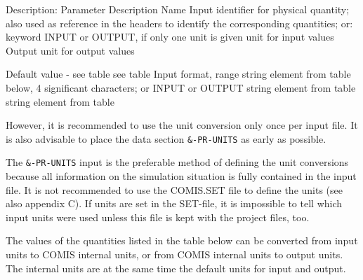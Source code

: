 \documentclass[10pt]{book}
\begin{document}
Description:  
Parameter  Description  
Name Input  identifier for physical quantity; also used as reference in the headers to identify the corresponding quantities; or: keyword INPUT or OUTPUT, if only one unit is given unit for input values  
Output  unit for output values  

Default value - 
see table see table Input format, range 
string element from table below, 4 significant characters; or INPUT or OUTPUT 
string element from table string element from table 

However, it is recommended to use the unit conversion only once per input file. It is also advisable to place the data section \verb|&-PR-UNITS| as early as possible.

The \verb|&-PR-UNITS| input is the preferable method of defining the unit conversions because all information on the simulation situation is fully contained in the input file. It is not recommended to use the COMIS.SET file to define the units (see also appendix C). If units are set in the SET-file, it is impossible to tell which input units were used unless this file is kept with the project files, too.

The values of the quantities listed in the table below can be converted from input units to COMIS internal units, or from COMIS internal units to output units. The internal units are at the same time the default units for input and output. 
%
\end{document}
